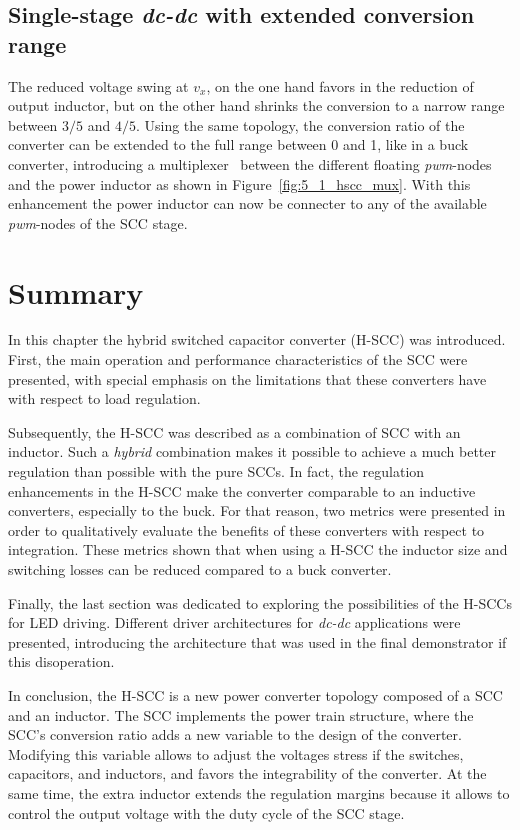 \subsection{Single-stage \emph{dc-dc} with extended conversion range }

The reduced voltage swing at $v_x$, on the one hand favors in the reduction of output inductor, but on the other hand shrinks the conversion to a narrow range between $3/5$ and $4/5$. Using the same topology, the conversion ratio of the converter can be extended to the full range between 0 and 1, like in a buck converter, introducing a multiplexer~\cite{WO2015/040517} between the different floating \emph{pwm}-nodes and the power inductor as shown in Figure~\ref{fig:5_1_hscc_mux}. With this enhancement the power inductor can now be connecter to any of the available \emph{pwm}-nodes of the SCC stage.


\section{Summary}

In this chapter the hybrid switched capacitor converter (H-SCC) was introduced. First, the main operation and performance characteristics of the SCC were presented, with special emphasis on the limitations that these converters have with respect to load  regulation.

Subsequently, the H-SCC was described as a combination of SCC with an inductor. Such a \emph{hybrid} combination makes it possible to achieve a much better regulation than possible with the pure SCCs. In fact, the regulation enhancements in the H-SCC make the converter comparable to an inductive converters, especially to the buck. For that reason, two metrics were presented in order to qualitatively evaluate the benefits of these converters with respect to integration. These metrics shown that when using a H-SCC the inductor size and switching losses can be reduced compared to a buck converter.

Finally, the last section was dedicated to exploring the possibilities of the H-SCCs for LED driving. Different driver architectures for \emph{dc-dc} applications were presented, introducing the architecture that was used in the final demonstrator if this disoperation. 

In conclusion, the H-SCC is a new power converter topology composed of a SCC and an inductor. The SCC implements the power train structure, where the SCC's conversion ratio adds a new variable to the design of the converter. Modifying this variable allows to adjust the voltages stress if the switches, capacitors, and inductors, and favors the integrability of the converter. At the same time, the extra inductor extends the regulation margins because it allows to control the output voltage with the duty cycle of the SCC stage.


\clearpage

 